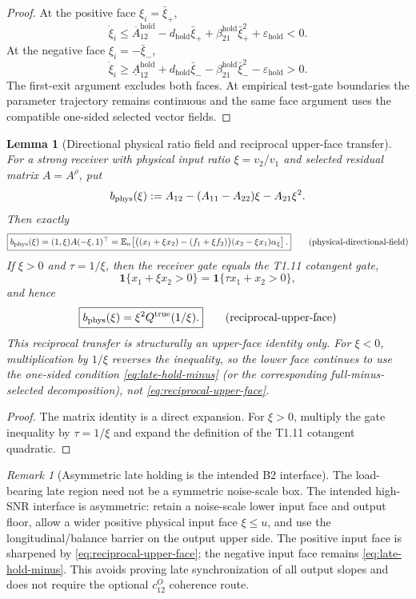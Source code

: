 \documentclass{article} %
\theoremstyle{plain}
\newtheorem{lemma}[theorem]{Lemma}
\theoremstyle{definition}
\theoremstyle{remark}
\newtheorem{remark}[theorem]{Remark}
\begin{document}
\begin{proof}
At the positive face $\xi_i=\bar\xi_+$,
\[
\dot\xi_i
\le
\overline A_{12}^{\mathrm{hold}}
-d_{\mathrm{hold}}\bar\xi_+
+\beta_{21}^{\mathrm{hold}}\bar\xi_+^2
+\varepsilon_{\mathrm{hold}}<0.
\]
At the negative face $\xi_i=-\bar\xi_-$,
\[
\dot\xi_i
\ge
\underline A_{12}^{\mathrm{hold}}
+d_{\mathrm{hold}}\bar\xi_-
-\beta_{21}^{\mathrm{hold}}\bar\xi_-^2
-\varepsilon_{\mathrm{hold}}>0.
\]
The first-exit argument excludes both faces. At empirical test-gate
boundaries the parameter trajectory remains continuous and the same face
argument uses the compatible one-sided selected vector fields.
\end{proof}

\begin{lemma}[Directional physical ratio field and reciprocal upper-face transfer]
\label{lem:late-directional-ratio}
For a strong receiver with physical input ratio $\xi=v_2/v_1$ and selected
residual matrix $A=A^\rho$, put
\[
 b_{\rm phys}(\xi)
 :=A_{12}-(A_{11}-A_{22})\xi-A_{21}\xi^2.
\]
Then exactly
\[
\boxed{
 b_{\rm phys}(\xi)
 =(1,\xi)A(-\xi,1)^\top
 =\mathbb E_n\!\left[
 \bigl((x_1+\xi x_2)-(f_1+\xi f_2)\bigr)
 (x_2-\xi x_1)\alpha_\xi
 \right].
}
\tag{physical-directional-field}\label{eq:physical-directional-field}
\]
If $\xi>0$ and $\tau=1/\xi$, then the receiver gate equals the T1.11
cotangent gate,
\[
 \mathbf 1\{x_1+\xi x_2>0\}
 =\mathbf 1\{\tau x_1+x_2>0\},
\]
and hence
\[
\boxed{
 b_{\rm phys}(\xi)=\xi^2Q^{\rm true}(1/\xi).
}
\tag{reciprocal-upper-face}\label{eq:reciprocal-upper-face}
\]
This reciprocal transfer is structurally an upper-face identity only.  For
$\xi<0$, multiplication by $1/\xi$ reverses the inequality, so the lower face
continues to use the one-sided condition \eqref{eq:late-hold-minus} (or the
corresponding full-minus-selected decomposition), not
\eqref{eq:reciprocal-upper-face}.
\end{lemma}
\begin{proof}
The matrix identity is a direct expansion.  For $\xi>0$, multiply the gate
inequality by $\tau=1/\xi$ and expand the definition of the T1.11 cotangent
quadratic.
\end{proof}

\begin{remark}[Asymmetric late holding is the intended B2 interface]
\label{rem:asymmetric-B2-holding}
The load-bearing late region need not be a symmetric noise-scale box.  The
intended high-SNR interface is asymmetric: retain a noise-scale lower input
face and output floor, allow a wider positive physical input face
$\xi\le u$, and use the longitudinal/balance barrier on the output upper
side.  The positive input face is sharpened by
\eqref{eq:reciprocal-upper-face}; the negative input face remains
\eqref{eq:late-hold-minus}.  This avoids proving late synchronization of all
output slopes and does not require the optional $c_{12}^O$ coherence route.
\end{remark}
\end{document}
